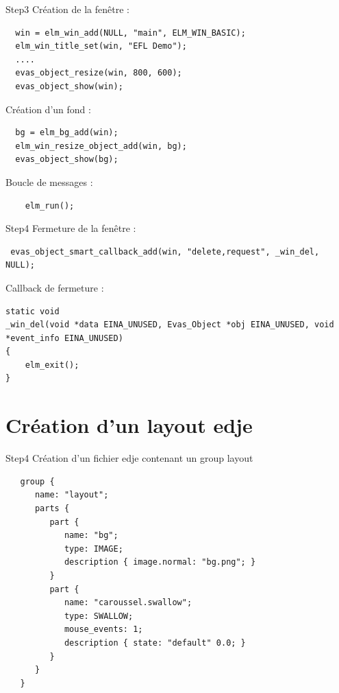 \documentclass{beamer}
\begin{document}
\begin{frame}[fragile]{Step3}
Création de la fenêtre :
\begin{lstlisting}
  win = elm_win_add(NULL, "main", ELM_WIN_BASIC);
  elm_win_title_set(win, "EFL Demo");
  ....
  evas_object_resize(win, 800, 600);
  evas_object_show(win);
\end{lstlisting}

Création d'un fond :
\begin{lstlisting}
  bg = elm_bg_add(win);
  elm_win_resize_object_add(win, bg);
  evas_object_show(bg);
\end{lstlisting}


Boucle de messages :
\begin{lstlisting}
    elm_run();
\end{lstlisting}
\end{frame}

\begin{frame}[fragile]{Step4}
Fermeture de la fenêtre :
\begin{lstlisting}
 evas_object_smart_callback_add(win, "delete,request", _win_del, NULL);
\end{lstlisting}

Callback de fermeture :
\begin{lstlisting}
static void
_win_del(void *data EINA_UNUSED, Evas_Object *obj EINA_UNUSED, void *event_info EINA_UNUSED)
{
    elm_exit();
}
\end{lstlisting}
\end{frame}

\section{Création d'un layout edje}
\begin{frame}[fragile]{Step4}
Création d'un fichier edje contenant un group layout
\begin{lstlisting}
   group {
      name: "layout";
      parts {
         part {
            name: "bg";
            type: IMAGE;
            description { image.normal: "bg.png"; }
         }
         part {
            name: "caroussel.swallow";
            type: SWALLOW;
            mouse_events: 1;
            description { state: "default" 0.0; }
         }
      }
   }
\end{lstlisting}
\end{frame}
\end{document}
